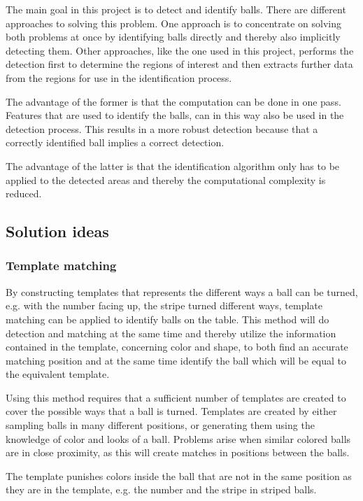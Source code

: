 The main goal in this project is to detect and identify balls. There are different approaches to solving this problem. One approach is to concentrate on solving both problems at once by identifying balls directly and thereby also implicitly detecting them. Other approaches, like the one used in this project, performs the detection first to determine the regions of interest and then extracts further data from the regions for use in the identification process.

The advantage of the former is that the computation can be done in one pass. Features that are used to identify the balls, can in this way also be used in the detection process. This results in a more robust detection because that a correctly identified ball implies a correct detection.

The advantage of the latter is that the identification algorithm only has to be applied to the detected areas and thereby the computational complexity is reduced.

\subsection{Solution ideas}

\subsubsection{Template matching}
By constructing templates that represents the different ways a ball can be turned, e.g. with the number facing up, the stripe turned different ways, template matching can be applied to identify balls on the table. This method will do detection and matching at the same time and thereby utilize the information contained in the template, concerning color and shape, to both find an accurate matching position and at the same time identify the ball which will be equal to the equivalent template.

Using this method requires that a sufficient number of templates are created to cover the possible ways that a ball is turned. Templates are created by either sampling balls in many different positions, or generating them using the knowledge of color and looks of a ball. Problems arise when similar colored balls are in close proximity, as this will create matches in positions between the balls.

The template punishes colors inside the ball that are not in the same position as they are in the template, e.g. the number and the stripe in striped balls. 

